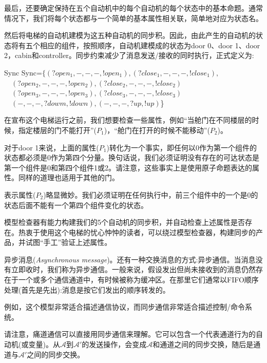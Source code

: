 \documentclass{book}
\begin{document}
    最后，还要确定保持在五个自动机中的每个自动机的每个状态中的基本命题。通常情况下，我们将每个状态都与一个简单的基本属性相关联，简单地对应为状态名。
    
    然后将电梯的自动机建模为这五种自动机的同步积。因此，由此产生的自动机的状态将有五个相应的组件，按照顺序，自动机建模成的状态为door  0、door 1、door 2，cabin和controller。同步约束减少了消息发送/接收的同时执行，正式定义为:
    \begin{tabbing}
      Sync  \kill
      Sync=$\{(?open_1,-,-,-,!open_1),(?close_1,-,-,-,!close_1),$\\
     $ \quad(?open_2,-,-,-,!open_2),(?close_2,-,-,-,!close_2)$\\
     $ \quad(?open_3,-,-,-,!open_3),(?close_3,-,-,-,!close_3)$\\
      $\quad(-,-,-,?dowm,!down),(-,-,-,?up,!up)$\}
    \end{tabbing}

    在宣布这个电梯运行之前，我们想要检查一些属性，例如“当舱门在不同楼层的时候，指定楼层的门不能打开”($P_1$)，“舱门在打开的时候不能移动”($P_2$)。
    
    对于door 1来说，上面的属性($P_1$)转化为一个事实，即任何以0作为第一个组件的状态都必须是0作为第四个分量。换句话说，我们必须证明没有存在的可达状态是第一个组件是0和第四个组件1或2。请注意，这些事实上是使用原子命题表达的属性。同样的道理也适用于其他的门。
    
    表示属性($P_2$)略显微妙。我们必须证明在任何执行中，前三个组件中的一个是0的状态后面不能有一个第四个组件变化的状态。
    
    模型检查器有能力构建我们的5个自动机的同步积，并自动检查上述属性是否存在。热衷于使用这个电梯的忧心忡忡的读者，可以绕过模型检查器，构建同步的产品，并试图“手工”验证上述属性。
    
    异步消息({\itshape Asynchronous message})。还有一种交换消息的方式:异步通信。当消息没有立即收时，我们称为异步通信。一般来说，假设发出但尚未接收到的消息仍然存在于一个或多个通信通道中，有时候被称为缓冲区。在那里它们通常以FIFO顺序处理(首先是先出):消息是按它们发出的顺序转发的。
    
    例如，这个模型非常适合描述通信协议，而同步通信非常适合描述控制/命令系统。
    
    请注意，痛道通信可以直接用同步通信来理解。它可以包含一个代表通道行为的自动机(或变量)。从$\mathcal{A}$到$\mathcal{A'}$的发送操作，会变成$\mathcal{A}$和通道之间的同步交换，随后是通道与$\mathcal{A'}$之间的同步交换。
    
\end{document}
